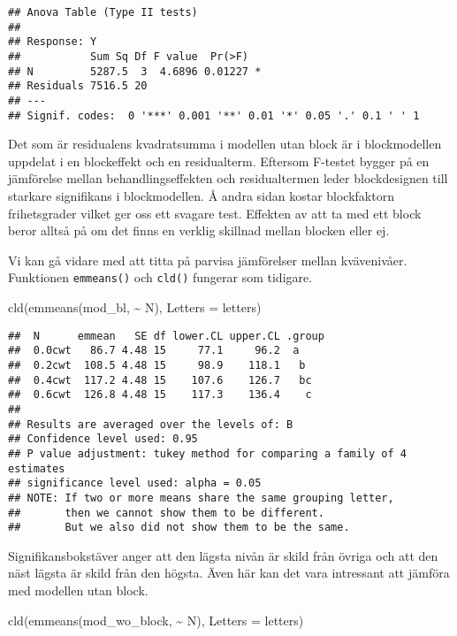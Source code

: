 \documentclass[
]{book}
\newenvironment{Shaded}{\begin{snugshade}}{\end{snugshade}}
\newcommand{\AttributeTok}[1]{\textcolor[rgb]{0.77,0.63,0.00}{#1}}
\newcommand{\FunctionTok}[1]{\textcolor[rgb]{0.00,0.00,0.00}{#1}}
\newcommand{\NormalTok}[1]{#1}
\newcommand{\SpecialCharTok}[1]{\textcolor[rgb]{0.00,0.00,0.00}{#1}}
\theoremstyle{definition}
\theoremstyle{definition}
\theoremstyle{definition}
\theoremstyle{definition}
\theoremstyle{remark}
\begin{document}
\begin{verbatim}
## Anova Table (Type II tests)
## 
## Response: Y
##           Sum Sq Df F value  Pr(>F)  
## N         5287.5  3  4.6896 0.01227 *
## Residuals 7516.5 20                  
## ---
## Signif. codes:  0 '***' 0.001 '**' 0.01 '*' 0.05 '.' 0.1 ' ' 1
\end{verbatim}

Det som är residualens kvadratsumma i modellen utan block är i blockmodellen uppdelat i en blockeffekt och en residualterm. Eftersom F-testet bygger på en jämförelse mellan behandlingseffekten och residualtermen leder blockdesignen till starkare signifikans i blockmodellen. Å andra sidan kostar blockfaktorn frihetsgrader vilket ger oss ett svagare test. Effekten av att ta med ett block beror alltså på om det finns en verklig skillnad mellan blocken eller ej.

Vi kan gå vidare med att titta på parvisa jämförelser mellan kvävenivåer. Funktionen \texttt{emmeans()} och \texttt{cld()} fungerar som tidigare.

\begin{Shaded}
\begin{Highlighting}[]
\FunctionTok{cld}\NormalTok{(}\FunctionTok{emmeans}\NormalTok{(mod\_bl, }\SpecialCharTok{\textasciitilde{}}\NormalTok{ N), }\AttributeTok{Letters =}\NormalTok{ letters)}
\end{Highlighting}
\end{Shaded}

\begin{verbatim}
##  N      emmean   SE df lower.CL upper.CL .group
##  0.0cwt   86.7 4.48 15     77.1     96.2  a    
##  0.2cwt  108.5 4.48 15     98.9    118.1   b   
##  0.4cwt  117.2 4.48 15    107.6    126.7   bc  
##  0.6cwt  126.8 4.48 15    117.3    136.4    c  
## 
## Results are averaged over the levels of: B 
## Confidence level used: 0.95 
## P value adjustment: tukey method for comparing a family of 4 estimates 
## significance level used: alpha = 0.05 
## NOTE: If two or more means share the same grouping letter,
##       then we cannot show them to be different.
##       But we also did not show them to be the same.
\end{verbatim}

Signifikansbokstäver anger att den lägsta nivån är skild från övriga och att den näst lägsta är skild från den högsta. Även här kan det vara intressant att jämföra med modellen utan block.

\begin{Shaded}
\begin{Highlighting}[]
\FunctionTok{cld}\NormalTok{(}\FunctionTok{emmeans}\NormalTok{(mod\_wo\_block, }\SpecialCharTok{\textasciitilde{}}\NormalTok{ N), }\AttributeTok{Letters =}\NormalTok{ letters)}
\end{Highlighting}
\end{Shaded}
\end{document}

